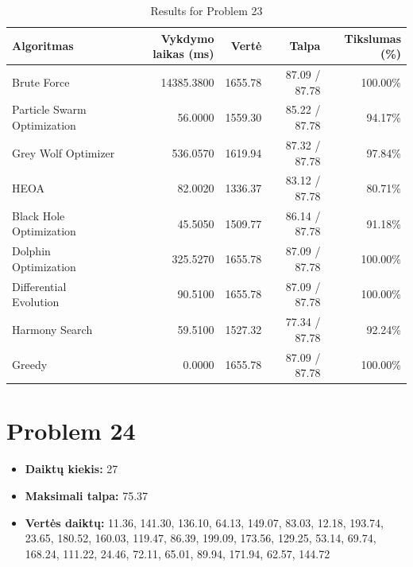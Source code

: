\documentclass[a4paper,11pt]{article}
\begin{document}
\begin{table}[h!]
\centering
\begin{tabular}{lrrrr}
\toprule
\textbf{Algoritmas} & \textbf{Vykdymo laikas (ms)} & \textbf{Vertė} & \textbf{Talpa} & \textbf{Tikslumas (\%)} \\
\midrule
Brute Force & 14385.3800 & 1655.78 & 87.09 / 87.78 & 100.00\% \\
Particle Swarm Optimization & 56.0000 & 1559.30 & 85.22 / 87.78 & 94.17\% \\
Grey Wolf Optimizer & 536.0570 & 1619.94 & 87.32 / 87.78 & 97.84\% \\
HEOA & 82.0020 & 1336.37 & 83.12 / 87.78 & 80.71\% \\
Black Hole Optimization & 45.5050 & 1509.77 & 86.14 / 87.78 & 91.18\% \\
Dolphin Optimization & 325.5270 & 1655.78 & 87.09 / 87.78 & 100.00\% \\
Differential Evolution & 90.5100 & 1655.78 & 87.09 / 87.78 & 100.00\% \\
Harmony Search & 59.5100 & 1527.32 & 77.34 / 87.78 & 92.24\% \\
Greedy & 0.0000 & 1655.78 & 87.09 / 87.78 & 100.00\% \\
\bottomrule
\end{tabular}
\caption{Results for Problem 23}
\end{table}
\clearpage

\section*{Problem 24}
\begin{itemize}
    \item \textbf{Daiktų kiekis:} 27
    \item \textbf{Maksimali talpa:} 75.37
    \item \textbf{Vertės daiktų:} 11.36, 141.30, 136.10, 64.13, 149.07, 83.03, 12.18, 193.74, 23.65, 180.52, 160.03, 119.47, 86.39, 199.09, 173.56, 129.25, 53.14, 69.74, 168.24, 111.22, 24.46, 72.11, 65.01, 89.94, 171.94, 62.57, 144.72
\end{itemize}
\end{document}
